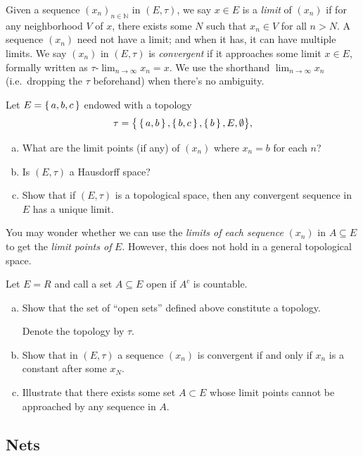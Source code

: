 Given a sequence $(x_n)_{n \in \mathbb N}$ in $(E, \tau)$,
we say $x \in E$ is a \textit{limit} of $(x_n)$ if for any neighborhood $V$ of $x$, there exists some $N$ such that $x_n \in V$ for all $n>N$.
A sequence $(x_n)$ need not have a limit; and when it has, it can have multiple limits.
We say $(x_n)$ in $(E, \tau)$ is \textit{convergent} if it approaches some limit $x \in E$, formally written as $\tau \text{-} \lim_{n\to\infty} x_n = x$. We use the shorthand $\lim_{n\to\infty} x_n$ (i.e.\ dropping the $\tau$ beforehand)  when there's no ambiguity.

\begin{qst}
  Let $E = \set{a,b,c}$ endowed with a topology 
  $$\tau = \big\{ \set{a,b},\set{b,c}, \set{b}, E, \emptyset \big\},$$
  \begin{enumerate}[(a)]
    \item What are the limit points (if any) of $(x_n)$ where $x_n = b$ for each $n$? 
    \item Is $(E,\tau)$ a Hausdorff space?
    \item Show that if $(E,\tau)$ is a topological space, then any convergent sequence in $E$ has a unique limit.
  \end{enumerate}
\end{qst}

\medskip

You may wonder whether we can use the \textit{limits of each sequence} $(x_n)$ in $A \subseteq E$ to get the \textit{limit points of} $E$.
However, this does not hold in a general topological space.

\begin{qst} 
Let $E = R$ and call a set $A \subseteq E$ open if $A^c$ is countable.
\begin{enumerate}[(a)]
  \item Show that the set of ``open sets'' defined above constitute a topology. 
   
  Denote the topology by $\tau$.
  
  \item Show that in $(E, \tau)$ a sequence $(x_n)$ is convergent if and only if $x_n$ is a constant after some $x_N$. 
  \item Illustrate that there exists some set $A \subset E$ whose limit points cannot be approached by any sequence in $A$.
\end{enumerate}  
\end{qst}

\subsection{Nets}


